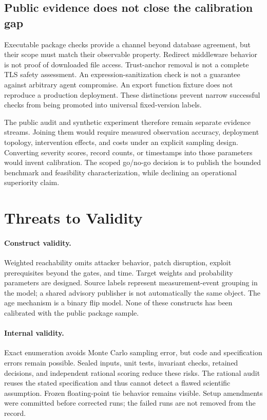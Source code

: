 \documentclass[manuscript,screen,nonacm]{acmart}
\begin{document}
\subsection{Public evidence does not close the calibration gap}
Executable package checks provide a channel beyond database agreement, but their scope must match their observable property. Redirect middleware behavior is not proof of downloaded file access. Trust-anchor removal is not a complete TLS safety assessment. An expression-sanitization check is not a guarantee against arbitrary agent compromise. An export function fixture does not reproduce a production deployment. These distinctions prevent narrow successful checks from being promoted into universal fixed-version labels.

The public audit and synthetic experiment therefore remain separate evidence streams. Joining them would require measured observation accuracy, deployment topology, intervention effects, and costs under an explicit sampling design. Converting severity scores, record counts, or timestamps into those parameters would invent calibration. The scoped go/no-go decision is to publish the bounded benchmark and feasibility characterization, while declining an operational superiority claim.

\section{Threats to Validity}
\paragraph{Construct validity.} Weighted reachability omits attacker behavior, patch disruption, exploit prerequisites beyond the gates, and time. Target weights and probability parameters are designed. Source labels represent measurement-event grouping in the model; a shared advisory publisher is not automatically the same object. The age mechanism is a binary flip model. None of these constructs has been calibrated with the public package sample.

\paragraph{Internal validity.} Exact enumeration avoids Monte Carlo sampling error, but code and specification errors remain possible. Sealed inputs, unit tests, invariant checks, retained decisions, and independent rational scoring reduce these risks. The rational audit reuses the stated specification and thus cannot detect a flawed scientific assumption. Frozen floating-point tie behavior remains visible. Setup amendments were committed before corrected runs; the failed runs are not removed from the record.
\end{document}
